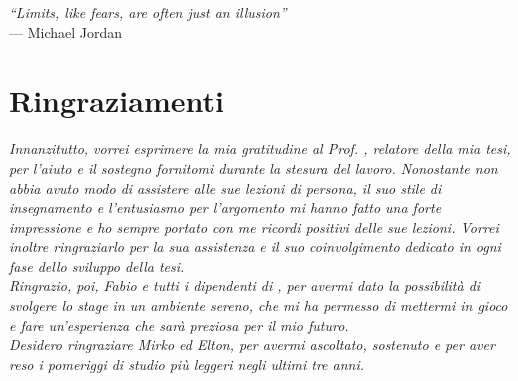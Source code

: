 
\cleardoublepage
{}
{}

\begin{flushright}{
		\slshape
		``Limits, like fears, are often just an illusion''} \\
	\medskip
	--- Michael Jordan
\end{flushright}

\bigskip

\begingroup
\let\clearpage\relax
\let\cleardoublepage\relax
\let\cleardoublepage\relax

\chapter*{Ringraziamenti}


\noindent \textit{Innanzitutto, vorrei esprimere la mia gratitudine al Prof.
	\myProf, relatore della mia tesi, per l'aiuto e il sostegno fornitomi
	durante
	la stesura del lavoro. Nonostante non abbia avuto modo di assistere
	alle sue
	lezioni di persona, il suo stile di insegnamento e l'entusiasmo per
	l'argomento
	mi hanno fatto una forte impressione e ho sempre portato con me ricordi
	positivi delle sue lezioni. Vorrei inoltre ringraziarlo per la sua
	assistenza e
	il suo coinvolgimento dedicato in ogni fase dello sviluppo della
	tesi.}\\


\noindent \textit{Ringrazio, poi, Fabio e tutti i dipendenti di \myCompany, per 	avermi dato la possibilità di svolgere lo stage in un ambiente sereno, che 		mi ha permesso di mettermi in gioco e fare un'esperienza che sarà preziosa 		per il mio futuro.}\\

\noindent \textit{Desidero ringraziare Mirko ed Elton, per avermi ascoltato,
	sostenuto e per aver reso i pomeriggi di studio più leggeri negli ultimi tre
	anni.}\\

